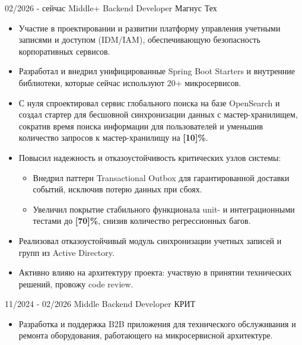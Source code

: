 \documentclass[9pt]{developercv} %
\begin{document}
\vspace{-0 pt}
\begin{entrylist}
    \entry
		{02/2026 - сейчас}
        {Middle+ Backend Developer}
        {Магнус Тех}
      {\vspace{-10pt}
        \begin{itemize}[noitemsep, topsep=4pt, parsep=0pt, partopsep=0pt, leftmargin=*]
            \item Участие в проектировании и развитии платформу управления учетными записями и доступом (IDM/IAM), обеспечивающую безопасность корпоративных сервисов.
            \item Разработал и внедрил унифицированные Spring Boot Starters и внутренние библиотеки, которые сейчас используют 20+ микросервисов.
            \item С нуля спроектировал сервис глобального поиска на базе OpenSearch и создал стартер для бесшовной синхронизации данных с мастер-хранилищем, сократив время поиска информации для пользователей и уменьшив количество запросов к мастер-хранилищу на \textbf{[10]\%}.
            \item Повысил надежность и отказоустойчивость критических узлов системы:
                \begin{itemize}[noitemsep, topsep=2pt, parsep=0pt, partopsep=0pt, leftmargin=*]
                    \item Внедрил паттерн Transactional Outbox для гарантированной доставки событий, исключив потерю данных при сбоях.
                    \item Увеличил покрытие стабильного функционала unit- и интеграционными тестами до \textbf{[70]\%}, снизив количество регрессионных багов.
                \end{itemize}
            \item Реализовал отказоустойчивый модуль синхронизации учетных записей и групп из Active Directory.
            \item Активно влияю на архитектуру проекта: участвую в принятии технических решений, провожу code review.
        \end{itemize}
        }
    \entry
		{11/2024 - 02/2026}
        {Middle Backend Developer}
        {КРИТ}
      {\vspace{-10pt}
        \begin{itemize}[noitemsep,topsep=0pt,parsep=0pt,partopsep=0pt, leftmargin=-1pt]
            \item {Разработка и поддержка B2B приложения для технического обслуживания и ремонта оборудования, работающего на микросервисной архитектуре.}

\end{itemize}}
\end{entrylist}
\end{document}
